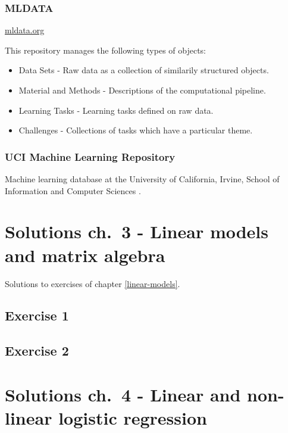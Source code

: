 \documentclass[]{book}
\providecommand{\tightlist}{%
  \setlength{\itemsep}{0pt}\setlength{\parskip}{0pt}}
\theoremstyle{definition}
\theoremstyle{definition}
\theoremstyle{definition}
\theoremstyle{remark}
\begin{document}
\subsection{MLDATA}\label{mldata}

\href{http://mldata.org/}{mldata.org}

This repository manages the following types of objects:

\begin{itemize}
\tightlist
\item
  Data Sets - Raw data as a collection of similarily structured objects.
\item
  Material and Methods - Descriptions of the computational pipeline.
\item
  Learning Tasks - Learning tasks defined on raw data.
\item
  Challenges - Collections of tasks which have a particular theme.
\end{itemize}

\subsection{UCI Machine Learning
Repository}\label{uci-machine-learning-repository}

Machine learning database at the University of California, Irvine,
School of Information and Computer Sciences \citep{Lichman2013}.

\chapter{Solutions ch.~3 - Linear models and matrix
algebra}\label{solutions-linear-models}

Solutions to exercises of chapter \ref{linear-models}.

\section{Exercise 1}\label{exercise-1}

\section{Exercise 2}\label{exercise-2}

\chapter{Solutions ch.~4 - Linear and non-linear logistic
regression}\label{solutions-logistic-regression}
\end{document}
